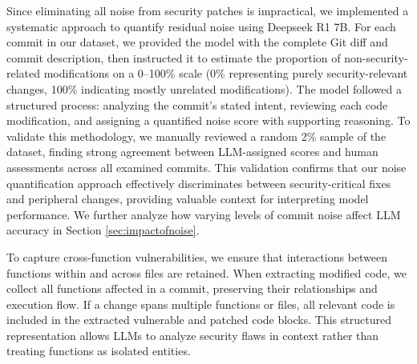 \documentclass[sigconf]{acmart}
\begin{document}
Since eliminating all noise from security patches is impractical, we implemented a systematic approach to quantify residual noise using Deepseek R1 7B. For each commit in our dataset, we provided the model with the complete Git diff and commit description, then instructed it to estimate the proportion of non-security-related modifications on a 0–100\% scale (0\% representing purely security-relevant changes, 100\% indicating mostly unrelated modifications). The model followed a structured process: analyzing the commit's stated intent, reviewing each code modification, and assigning a quantified noise score with supporting reasoning. To validate this methodology, we manually reviewed a random 2\% sample of the dataset, finding strong agreement between LLM-assigned scores and human assessments across all examined commits. This validation confirms that our noise quantification approach effectively discriminates between security-critical fixes and peripheral changes, providing valuable context for interpreting model performance. We further analyze how varying levels of commit noise affect LLM accuracy in Section \ref{sec:impactofnoise}.

To capture cross-function vulnerabilities, we ensure that interactions between functions within and across files are retained. When extracting modified code, we collect all functions affected in a commit, preserving their relationships and execution flow. If a change spans multiple functions or files, all relevant code is included in the extracted vulnerable and patched code blocks. This structured representation allows LLMs to analyze security flaws in context rather than treating functions as isolated entities.
\end{document}
